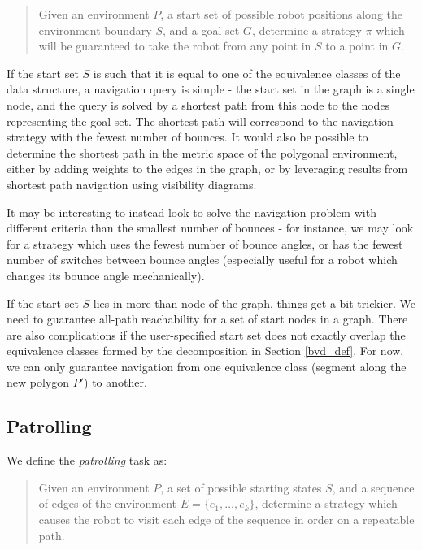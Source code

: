 \documentclass[]{article}  %
\begin{document}
\begin{quotation}
Given an environment $P$, a start set of possible robot positions along the
environment boundary $S$, and a goal set $G$, determine a strategy $\pi$ which
will be guaranteed to take the robot from any point in $S$ to a point in $G$.
\end{quotation}

If the start set $S$ is such that it is equal to one of the equivalence
classes of the data structure, a navigation query is simple - the start set in
the graph is a single node, and the query is solved by a shortest path from this
node to the nodes representing the goal set. The shortest path will correspond
to the navigation strategy with the fewest number of bounces. It would also be
possible to determine the shortest path in the metric space of the polygonal
environment, either by adding weights to the edges in the graph, or by
leveraging results from shortest path navigation using visibility diagrams.

It may be
interesting to instead look to solve the navigation problem with different
criteria than the smallest number of bounces - for instance, we may look for a
strategy which uses the fewest number of bounce angles, or has the fewest number
of switches between bounce angles (especially useful for a robot which changes
its bounce angle mechanically).

If the start set $S$ lies in more than node of the graph, things get a bit
trickier. We need to guarantee all-path reachability for a set of start nodes in
a graph. There are also complications if the user-specified start set does not
exactly overlap the equivalence classes formed by the decomposition in Section
\ref{bvd_def}. For now, we can only guarantee navigation from one equivalence
class (segment along the new polygon $P'$) to another.



\subsection{Patrolling \label{patrol}}

We define the \emph{patrolling} task as:

\begin{quotation}
Given an environment $P$, a set of possible starting states $S$, and
a sequence of edges of the environment $E = \{e_1, \ldots, e_k\}$,
determine a strategy which causes the robot to visit each edge of the sequence
in order on a repeatable path.
\end{quotation}
\end{document}

